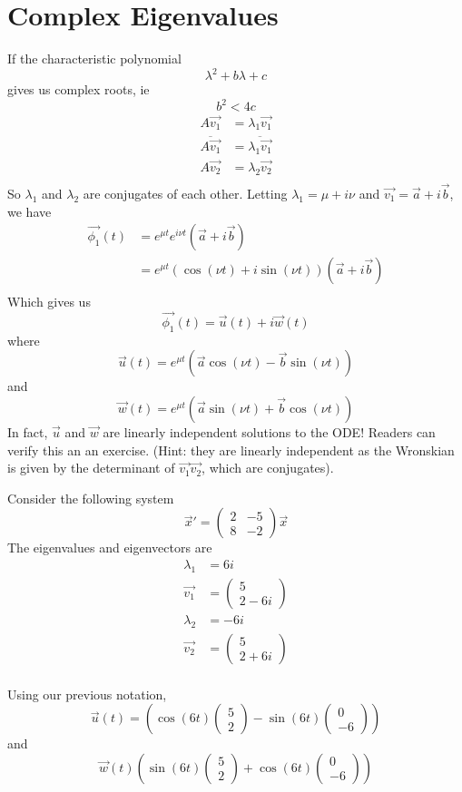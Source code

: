 \documentclass[12pt]{article}
\begin{document}
\section{Complex Eigenvalues}

If the characteristic polynomial
$$\lambda^2 + b\lambda + c$$
gives us complex roots, ie
$$b^2 < 4c$$
\begin{align*}
	A\vec{v_1} &= \lambda_1\vec{v_1} \\
	\overline{A\vec{v_1}} &= \overline{\lambda_1\vec{v_1}} \\
	A\vec{v_2} &= \lambda_2\vec{v_2} \\
\end{align*}
So $\lambda_1$ and $\lambda_2$ are conjugates of each other. Letting $\lambda_1 = \mu + i\nu$ and $\vec{v_1} = \vec{a} + i\vec{b}$, we have
\begin{align*}
	\vec{\phi_1}(t) &= e^{\mu t}e^{i\nu t}(\vec{a} + i\vec{b}) \\
			&= e^{\mu t}(\cos(\nu t) + i\sin(\nu t))(\vec{a} + i\vec{b}) \\
\end{align*}
Which gives us
$$\vec{\phi_1}(t) = \vec{u}(t) + i\vec{w}(t)$$
where
$$\vec{u}(t) = e^{\mu t}(\vec{a}\cos(\nu t) - \vec{b}\sin(\nu t))$$
and
$$\vec{w}(t) = e^{\mu t}(\vec{a}\sin(\nu t) + \vec{b}\cos(\nu t))$$
In fact, $\vec{u}$ and $\vec{w}$ are linearly independent solutions to the ODE! Readers can verify this an an exercise. (Hint: they are linearly independent as the Wronskian is given by the determinant of $\vec{v_1} \vec{v_2}$, which are conjugates).

Consider the following system
$$\vec{x}' = \begin{pmatrix} 2 & -5 \\ 8 & -2 \end{pmatrix} \vec{x}$$
The eigenvalues and eigenvectors are
\begin{align*}
	\lambda_1 &= 6i \\
	\vec{v_1} &= \begin{pmatrix} 5 \\ 2-6i \end{pmatrix} \\
	\lambda_2 &= -6i \\
	\vec{v_2} &= \begin{pmatrix} 5 \\ 2+6i \end{pmatrix} \\
\end{align*}

Using our previous notation,
$$\vec{u}(t) = \left(\cos(6t) \begin{pmatrix} 5 \\ 2 \end{pmatrix} - \sin(6t) \begin{pmatrix} 0 \\ -6 \end{pmatrix}\right)$$
and
$$\vec{w}(t) \left(\sin(6t) \begin{pmatrix} 5 \\ 2 \end{pmatrix} + \cos(6t) \begin{pmatrix} 0 \\ -6 \end{pmatrix}\right)$$
\end{document}
